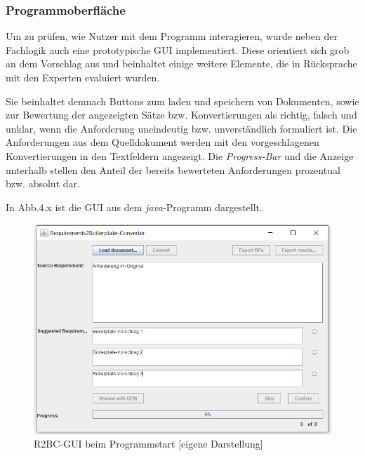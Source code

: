 \documentclass[12pt]{report}
\begin{document}
\subsubsection{Programmoberfläche}
Um zu prüfen, wie Nutzer mit dem Programm interagieren, wurde neben der Fachlogik auch eine prototypische GUI implementiert. Diese orientiert sich grob an dem Vorschlag aus \cite{zh17} und beinhaltet einige weitere Elemente, die in Rücksprache mit den Experten evaluiert wurden. 

Sie beinhaltet demnach Buttons zum laden und speichern von Dokumenten, sowie zur Bewertung der angezeigten Sätze bzw. Konvertierungen als richtig, falsch und unklar, wenn die Anforderung uneindeutig bzw. unverständlich formuliert ist. Die Anforderungen aus dem Quelldokument werden mit den vorgeschlagenen Konvertierungen in den Textfeldern angezeigt. Die \textit{Progress-Bar} und die Anzeige unterhalb stellen den Anteil der bereits bewerteten Anforderungen prozentual bzw. absolut dar.

In Abb.4.x ist die GUI aus dem \textit{java}-Programm dargestellt.

\begin{figure}[h!]
\begin{center}
\includegraphics[scale=0.7]{Bilder/GUI-leer.png}
\caption{R2BC-GUI beim Programmstart [eigene Darstellung]}
\end{center}
\end{figure}
\end{document}
